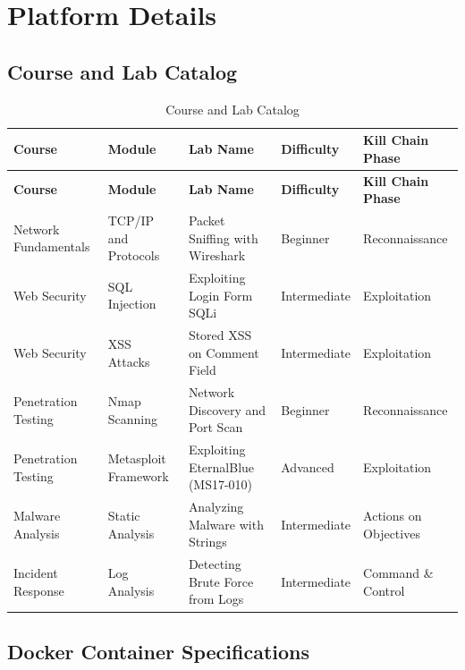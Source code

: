 \documentclass[12pt,a4paper]{report}
\newcommand{\hrow}{}
\newcommand{\hcell}[1]{\textbf{#1}}
\newcommand{\altrow}{}
\begin{document}
\section{Platform Details}

\subsection{Course and Lab Catalog}

\small
\begin{longtable}{|L{2.7cm}|L{2.7cm}|L{3.35cm}|L{2.05cm}|L{3.05cm}|}
\caption{Course and Lab Catalog}\label{tab:catalog}\\
\hline
\hrow \hcell{Course} & \hcell{Module} & \hcell{Lab Name} & \hcell{Difficulty} & \hcell{Kill Chain Phase} \\
\hline
\endfirsthead
\hline
\hrow \hcell{Course} & \hcell{Module} & \hcell{Lab Name} & \hcell{Difficulty} & \hcell{Kill Chain Phase} \\
\hline
\endhead
Network Fundamentals & TCP/IP and Protocols & Packet Sniffing with Wireshark & Beginner & Reconnaissance \\\hline
\altrow Web Security & SQL Injection & Exploiting Login Form SQLi & Inter\-mediate & Exploitation \\\hline
Web Security & XSS Attacks & Stored XSS on Comment Field & Inter\-mediate & Exploitation \\\hline
\altrow Penetration Testing & Nmap Scanning & Network Discovery and Port Scan & Beginner & Reconnaissance \\\hline
Penetration Testing & Metasploit Framework & Exploiting EternalBlue (MS17-010) & Advanced & Exploitation \\\hline
\altrow Malware Analysis & Static Analysis & Analyzing Malware with Strings & Inter\-mediate & Actions on Objectives \\\hline
Incident Response & Log Analysis & Detecting Brute Force from Logs & Inter\-mediate & Command \& Control \\\hline
\end{longtable}
\normalsize

\subsection{Docker Container Specifications}
\end{document}
